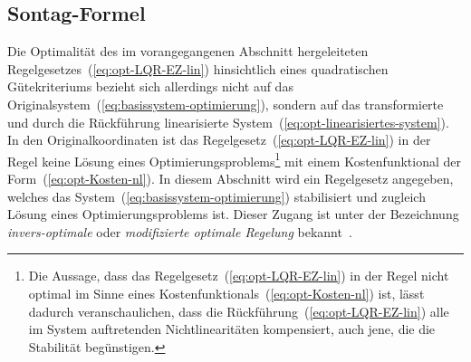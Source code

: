 \subsection{Sontag-Formel}

Die Optimalität des im vorangegangenen Abschnitt hergeleiteten Regelgesetzes~(\ref{eq:opt-LQR-EZ-lin})
hinsichtlich eines quadratischen Gütekriteriums bezieht sich allerdings
nicht auf das Originalsystem~(\ref{eq:basissystem-optimierung}),
sondern auf das transformierte und durch die Rückführung linearisierte
System~(\ref{eq:opt-linearisiertes-system}). In den Originalkoordinaten
ist das Regelgesetz~(\ref{eq:opt-LQR-EZ-lin}) in der Regel keine
Lösung eines Optimierungsproblems\footnote{Die Aussage, dass das Regelgesetz~(\ref{eq:opt-LQR-EZ-lin}) in der
Regel nicht optimal im Sinne eines Kostenfunktionals~(\ref{eq:opt-Kosten-nl})
ist, lässt dadurch veranschaulichen, dass die Rückführung~(\ref{eq:opt-LQR-EZ-lin})
alle im System auftretenden Nichtlinearitäten kompensiert, auch jene,
die die Stabilität begünstigen.} mit einem Kostenfunktional der Form~(\ref{eq:opt-Kosten-nl}). In
diesem Abschnitt wird ein Regelgesetz angegeben, welches das System~(\ref{eq:basissystem-optimierung})
stabilisiert und zugleich Lösung eines Optimierungsproblems ist. Dieser
Zugang ist unter der Bezeichnung \emph{invers-optimale}
oder \emph{modifizierte optimale Regelung} 
bekannt~\cite{freeman96control,freeman96siam,freeman1996buch,sepulchre97,sackmann2005modifizierte}.

